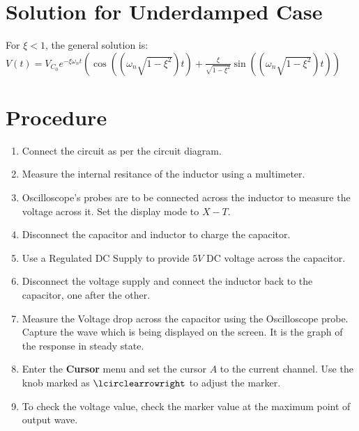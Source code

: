 \documentclass[12pt]{article}
\providecommand{\brak}[1]{\ensuremath{\left(#1\right)}}
\begin{document}
\section{Solution for Underdamped Case}
For $\xi < 1$, the general solution is:\newline
$V\brak{t} = V_{C_0}e^{-\xi\omega_n t}\brak{\cos\brak{\brak{\omega_n\sqrt{1-\xi^2}}t} + \frac{\xi}{\sqrt{1-\xi^2}}\sin\brak{\brak{\omega_n\sqrt{1-\xi^2}}t}}$
\section{Procedure}
\begin{enumerate}
    \item Connect the circuit as per the circuit diagram.
    \item Measure the internal resitance of the inductor using a multimeter.
    \item Oscilloscope's probes are to be connected across the inductor to measure the voltage across it. Set the display mode to $X - T$.
    \item Disconnect the capacitor and inductor to charge the capacitor.
    \item Use a Regulated DC Supply to provide $5 V$ DC voltage across the capacitor.
    \item Disconnect the voltage supply and connect the inductor back to the capacitor, one after the other. 
    \item Measure the Voltage drop across the capacitor using the Oscilloscope probe. Capture the wave which is being displayed on the screen. It is the graph of the response in steady state.
    \item Enter the \textbf{Cursor} menu and set the cursor $A$ to the current channel. Use the knob marked as $\lcirclearrowright$ to adjust the marker.
    \item To check the voltage value, check the marker value at the maximum point of output wave.
\end{enumerate}
\end{document}
